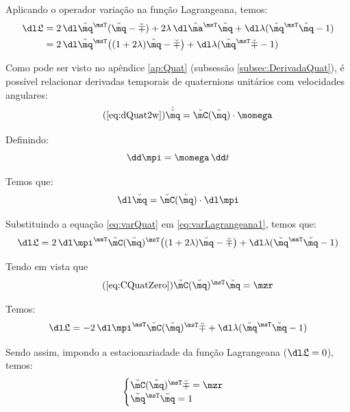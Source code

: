 \documentclass[]{politex}
\begin{document}
Aplicando o operador variação na função Lagrangeana, temos:
\begin{equation} \label{eq:varLagrangeana1}
\begin{split}
\dl \mathfrak{L} &= 2 \, \dl \breve{\mq}^\msT (\breve{\mq} -\breve{\mp}) + 2\lambda \, \dl \breve{\ma}^\msT \breve{\mq} + \dl \lambda(\breve{\mq}^\msT \breve{\mq} - 1) \\
&= 2 \, \dl \breve{\mq}^\msT \big((1+2\lambda)\breve{\mq} -\breve{\mp} \big) + \dl \lambda(\breve{\mq}^\msT \breve{\mp} - 1) \\
\end{split}
\end{equation}

Como pode ser visto no apêndice \ref{ap:Quat} (subsessão \ref{subsec:DerivadaQuat}), é possível relacionar derivadas temporais de quaternions unitários com velocidades angulares:
\begin{equation} \tag{\ref{eq:dQuat2w}}
\dot{\breve{\mq}} = \breve{\mC}(\breve{\mq}) \cdot \momega
\end{equation}

Definindo:
\begin{equation}
\dd \mpi = \momega  \, \dd t
\end{equation}

Temos que:
\begin{equation} \label{eq:varQuat}
\dl \breve{\mq} = \breve{\mC}(\breve{\mq}) \cdot \dl \mpi
\end{equation}

Substituindo a equação \eqref{eq:varQuat} em \eqref{eq:varLagrangeana1}, temos que:
\begin{equation}
\dl \mathfrak{L} = 2 \, \dl \mpi^\msT \breve{\mC}(\breve{\mq})^\msT \big((1+2\lambda)\breve{\mq} -\breve{\mp} \big) + \dl \lambda(\breve{\mq}^\msT \breve{\mq} - 1) \\
\end{equation}

Tendo em vista que
\begin{equation} \tag{\ref{eq:CQuatZero}}
\breve{\mC} (\breve{\mq})^\msT \breve{\mq} = \mzr
\end{equation}

Temos:
\begin{equation}
\dl \mathfrak{L} = -2 \, \dl \mpi^\msT \breve{\mC} (\breve{\mq}) ^\msT \breve{\mp}  + \dl \lambda(\breve{\mq}^\msT \breve{\mq} - 1) \\
\end{equation}

Sendo assim, impondo a estacionariadade da função Lagrangeana ($\dl \mathfrak{L} = 0$), temos:
\begin{equation}
\begin{cases}
\breve{\mC}(\breve{\mq})^\msT \breve{\mp} = \mzr \\
\breve{\mq}^\msT \breve{\mq} = 1
\end{cases}
\end{equation}
\end{document}
